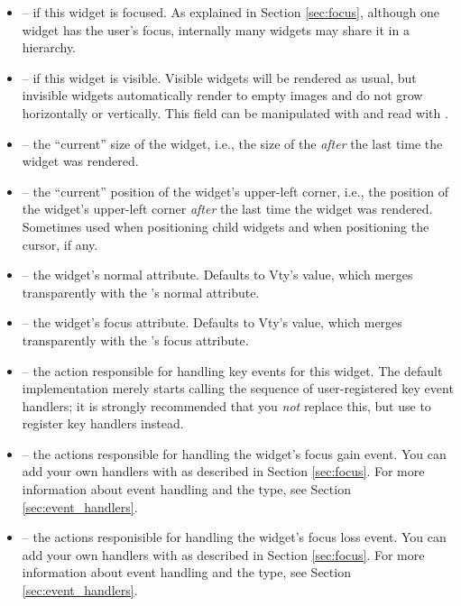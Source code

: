 \begin{itemize}
\item {} --  if this widget is focused.  As
  explained in Section \ref{sec:focus}, although one widget has the
  user's focus, internally many widgets may share it in a hierarchy.
\item {} --  if this widget is visible.  Visible
  widgets will be rendered as usual, but invisible widgets
  automatically render to empty images and do not grow horizontally or
  vertically.  This field can be manipulated with  and
  read with .
\item {} -- the ``current'' size of the widget, i.e.,
  the size of the  \textit{after} the last time the widget
  was rendered.
\item {} -- the ``current'' position of the widget's
  upper-left corner, i.e., the position of the widget's upper-left
  corner \textit{after} the last time the widget was rendered.
  Sometimes used when positioning child widgets and when positioning
  the cursor, if any.
\item {} -- the widget's normal attribute.  Defaults
  to Vty's  value, which merges transparently with the
  's normal attribute.
\item {} -- the widget's focus attribute.  Defaults
  to Vty's  value, which merges transparently with the
  's focus attribute.
\item {} -- the action responsible for handling key
  events for this widget.  The default implementation merely starts
  calling the sequence of user-registered key event handlers; it is
  strongly recommended that you \textit{not} replace this, but use
   to register key handlers instead.
\item {} -- the actions responsible for handling
  the widget's focus gain event.  You can add your own handlers with
   as described in Section \ref{sec:focus}.  For more
  information about event handling and the  type, see
  Section \ref{sec:event_handlers}.
\item {} -- the actions responisible for handling
  the widget's focus loss event.  You can add your own handlers with
   as described in Section \ref{sec:focus}.  For more
  information about event handling and the  type, see
  Section \ref{sec:event_handlers}.
\end{itemize}

